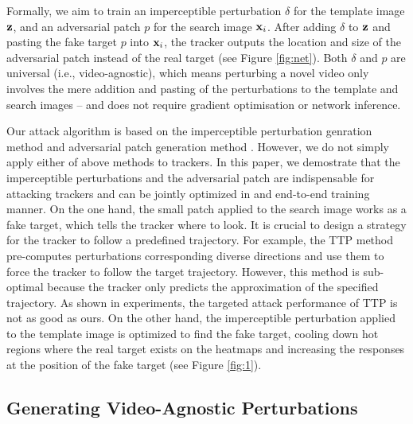 \documentclass[journal]{IEEEtran}
\newcommand{\ie}{i.e.}
\begin{document}
Formally, we aim to train an imperceptible perturbation $\delta$ for the template image $\textbf z$, and an adversarial patch $p$ for the search image $\textbf x_i$. After adding $\delta$ to $\textbf z$ and pasting the fake target $p$ into $\textbf x_i$, the tracker outputs the location and size of the adversarial patch instead of the real target (see Figure \ref{fig:net}). Both $\delta$ and $p$ are universal (\ie, video-agnostic), which means perturbing a novel video only involves the mere addition and pasting of the perturbations to the template and search images -- and does not require gradient optimisation or network inference.

Our attack algorithm is based on the imperceptible perturbation genration method \cite{FGSM} and adversarial patch generation method \cite{patch}. However, we do not simply apply either of above methods to trackers. In this paper, we demostrate that the imperceptible perturbations and the adversarial patch are indispensable for attacking trackers and can be jointly optimized in and end-to-end training manner. On the one hand, the small patch applied to the search image works as a fake target, which tells the tracker where to look. It is crucial to design a strategy for the tracker to follow a predefined trajectory. For example, the TTP method \cite{TTP} pre-computes perturbations corresponding diverse directions and use them to force the tracker to follow the target trajectory. However, this method is sub-optimal because the tracker only predicts the approximation of the specified trajectory. As shown in experiments, the targeted attack performance of TTP is not as good as ours. On the other hand, the imperceptible perturbation applied to the template image is optimized to find the fake target, cooling down hot regions where the real target exists on the heatmaps and increasing the responses at the position of the fake target (see Figure \ref{fig:1}).

\subsection{Generating Video-Agnostic Perturbations}
\end{document}
